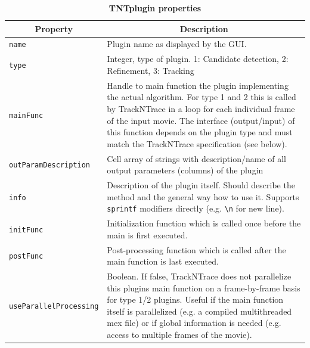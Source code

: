 \documentclass[11pt,onside]{report}
\numberwithin{equation}{chapter}
\begin{document}
\begin{table}[!h]
\centering
\caption*{\textbf{TNTplugin properties}}
\begin{tabular}{p{} p{}}
\toprule
\multicolumn{1}{c}{Property} & \multicolumn{1}{c}{Description}\\ \midrule
  \texttt{name} & Plugin name as displayed by the GUI. \\
  \texttt{type} & Integer, type of plugin. 1: Candidate detection, 2: Refinement, 3: Tracking \\
  \texttt{mainFunc} & Handle to main function the plugin implementing the actual algorithm. For type 1 and 2 this is called by TrackNTrace in a loop for each individual frame of the input movie. The interface (output/input) of this function depends on the plugin type and must match the TrackNTrace specification (see below). \\
  \texttt{outParamDescription} &  Cell array of strings with description/name of all output parameters (columns) of the plugin \\
 \texttt{info} & Description of the plugin itself. Should describe the method and the general way how to use it. Supports \texttt{sprintf} modifiers directly (e.g. \texttt{\textbackslash n} for new line). \\
  \texttt{initFunc} &  Initialization function which is called once before the main is first executed. \\
  \texttt{postFunc} & Post-processing function which is called after the main function is last executed. \\
  \texttt{useParallelProcessing}&  Boolean. If false, TrackNTrace does not parallelize this plugins main function on a frame-by-frame basis for type 1/2 plugins. Useful if the main function itself is parallelized (e.g. a compiled multithreaded mex file) or if global information is needed (e.g. access to multiple frames of the movie).\\
  \bottomrule
\end{tabular}\\
\end{table}
\end{document}
